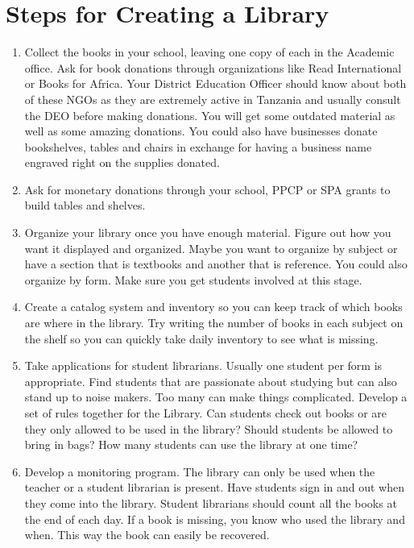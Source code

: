 \section{Steps for Creating a Library}
\begin{enumerate}
\item Collect the books in your school, leaving one copy of each in the Academic office. Ask for book donations through organizations like Read International or Books for Africa.  Your District Education Officer should know about both of these NGOs as they are extremely active in Tanzania and usually consult the DEO before making donations. You will get some outdated material as well as some amazing donations. You could also have businesses donate bookshelves, tables and chairs in exchange for having a business name engraved right on the supplies donated.

\item Ask for monetary donations through your school, PPCP or SPA grants to build tables and shelves.

\item Organize your library once you have enough material. Figure out how you want it displayed and organized. Maybe you want to organize by subject or have a section that is textbooks and another that is reference.  You could also organize by form.  Make sure you get students involved at this stage.

\item Create a catalog system and inventory so you can keep track of which books are where in the library. Try writing the number of books in each subject on the shelf so you can quickly take daily inventory to see what is missing.

\item Take applications for student librarians. Usually one student per form is appropriate. Find students that are passionate about studying but can also stand up to noise makers. Too many can make things complicated.  Develop a set of rules together for the Library.  Can students check out books or are they only allowed to be used in the library? Should students be allowed to bring in bags? How many students can use the library at one time?

\item Develop a monitoring program.  The library can only be used when the teacher or a student librarian is present. Have students sign in and out when they come into the library.  Student librarians should count all the books at the end of each day.  If a book is missing, you know who used the library and when. This way the book can easily be recovered.


\end{enumerate}
